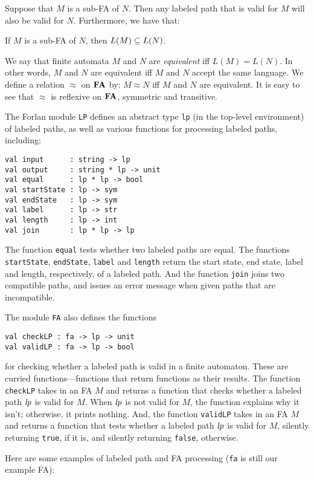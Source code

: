 Suppose that $M$ is a sub-FA of $N$.  Then any labeled path that is
valid for $M$ will also be valid for $N$.  Furthermore, we have that:

\begin{proposition}
If $M$ is a sub-FA of $N$, then $L(M)\subseteq L(N)$.
\end{proposition}

We say that finite automata $M$ and $N$ are \emph{equivalent} iff
$L(M) = L(N)$.  In other words, $M$ and $N$ are equivalent iff $M$ and
$N$ accept the same language.  We define a relation $\approx$ on $\mathbf{FA}$
by: $M\approx N$ iff $M$ and $N$ are equivalent.  It is easy to see
that $\approx$ is reflexive on $\mathbf{FA}$, symmetric and transitive.

The Forlan module \texttt{LP} defines an abstract type \texttt{lp} (in the
top-level environment) of labeled paths, as well as various functions
for processing labeled paths, including:
\begin{verbatim}
val input      : string -> lp
val output     : string * lp -> unit
val equal      : lp * lp -> bool
val startState : lp -> sym
val endState   : lp -> sym
val label      : lp -> str
val length     : lp -> int
val join       : lp * lp -> lp
\end{verbatim}
The function \texttt{equal} tests whether two labeled paths are
equal.  The functions \texttt{startState}, \texttt{endState},
\texttt{label} and \texttt{length} return the start state, end
state, label and length, respectively, of a labeled path.  And
the function \texttt{join} joins two compatible paths, and issues
an error message when given paths that are incompatible.

The module \texttt{FA} also defines the functions
\begin{verbatim}
val checkLP : fa -> lp -> unit
val validLP : fa -> lp -> bool
\end{verbatim}
for checking whether a labeled path is valid in a finite automaton.
These are curried functions---functions that return functions
as their results.
The function \texttt{checkLP} takes in an FA $M$ and returns a function
that checks whether a labeled path ${\it lp}$ is valid for $M$.  When
${\it lp}$ is not valid for $M$, the function explains why it isn't;
otherwise, it prints nothing. 
And, the function \texttt{validLP} takes in an FA $M$ and returns a function
that tests whether a labeled path ${\it lp}$ is valid for $M$, silently
returning \texttt{true}, if it is, and silently returning \texttt{false},
otherwise.

Here are some examples of labeled path and FA processing
(\texttt{fa} is still our example FA):


